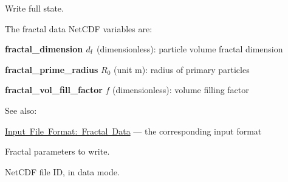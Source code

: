 Write full state.

The fractal data Net\+C\+DF variables are\+:
\begin{DoxyItemize}
\item {\bfseries fractal\+\_\+dimension} $d_{\rm f}$ (dimensionless)\+: particle volume fractal dimension
\item {\bfseries fractal\+\_\+prime\+\_\+radius} $R_0$ (unit m)\+: radius of primary particles
\item {\bfseries fractal\+\_\+vol\+\_\+fill\+\_\+factor} $f$ (dimensionless)\+: volume filling factor
\end{DoxyItemize}

See also\+:
\begin{DoxyItemize}
\item \mbox{\hyperlink{input_format_fractal}{Input File Format\+: Fractal Data}} --- the corresponding input format
\end{DoxyItemize}

Fractal parameters to write.

Net\+C\+DF file ID, in data mode. 